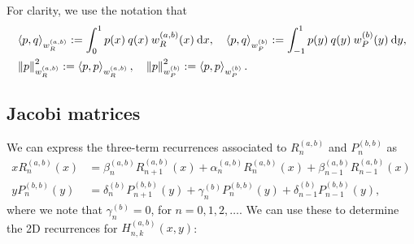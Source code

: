 \documentclass[11pt, oneside]{article}   	%
\newcommand{\hdop}{H}
\newcommand{\hdopnkab}{\hdop_{n,k}^{(a,b)}}
\newcommand{\genjac}{R}
\newcommand{\genjacw}{w_\genjac}
\begin{document}
For clarity, we use the notation that 
\begin{align*}
&\ip<p, q>_{\genjacw^{(a,b)}} := \int_0^1 p(x) \: q(x) \: \genjacw^{(a,b)}(x) \: \D x, \quad
\ip<p, q>_{w_P^{(b)}} := \int_{-1}^1 p(y) \: q(y) \: w_P^{(b)}(y)\: \D y, \\
&\norm{p}_{\genjacw^{(a,b)}}^2 := \ip<p, p>_{\genjacw^{(a,b)}}, \quad
\norm{p}_{w_P^{(b)}}^2 := \ip<p, p>_{w_P^{(b)}}.
\end{align*}


\subsection{Jacobi matrices}

We can express the three-term recurrences associated to $\genjac_n^{(a,b)}$ and $P_n^{(b,b)}$ as
\begin{align}
x \genjac_n^{(a,b)}(x) &= \beta_n^{(a,b)} \genjac_{n+1}^{(a,b)}(x) + \alpha_n^{(a,b)} \genjac_n^{(a,b)}(x) + \beta_{n-1}^{(a,b)} \genjac_{n-1}^{(a,b)}(x) 
\label{eqn:Hrecurrence} \\
y P_n^{(b,b)}(y) &= \delta_n^{(b)} P_{n+1}^{(b,b)}(y) + \gamma_n^{(b)} P_n^{(b,b)}(y) + \delta_{n-1}^{(b)} P_{n-1}^{(b,b)}(y),
\end{align}
where we note that \(\gamma_n^{(b)} = 0\), for \( n = 0,1,2,\dots\). We can use these to determine the 2D recurrences for $\hdopnkab(x,y)$:
\end{document}
